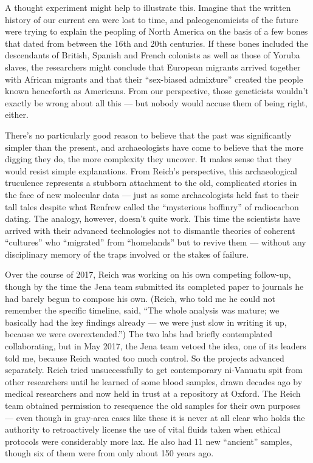 A thought experiment might help to illustrate this. Imagine that the
written history of our current era were lost to time, and
paleogenomicists of the future were trying to explain the peopling of
North America on the basis of a few bones that dated from between the
16th and 20th centuries. If these bones included the descendants of
British, Spanish and French colonists as well as those of Yoruba slaves,
the researchers might conclude that European migrants arrived together
with African migrants and that their ``sex-biased admixture'' created
the people known henceforth as Americans. From our perspective, those
geneticists wouldn't exactly be wrong about all this --- but nobody
would accuse them of being right, either.

There's no particularly good reason to believe that the past was
significantly simpler than the present, and archaeologists have come to
believe that the more digging they do, the more complexity they uncover.
It makes sense that they would resist simple explanations. From Reich's
perspective, this archaeological truculence represents a stubborn
attachment to the old, complicated stories in the face of new molecular
data --- just as some archaeologists held fast to their tall tales
despite what Renfrew called the ``mysterious boffinry'' of radiocarbon
dating. The analogy, however, doesn't quite work. This time the
scientists have arrived with their advanced technologies not to
dismantle theories of coherent ``cultures'' who ``migrated'' from
``homelands'' but to revive them --- without any disciplinary memory of
the traps involved or the stakes of failure.

Over the course of 2017, Reich was working on his own competing
follow-up, though by the time the Jena team submitted its completed
paper to journals he had barely begun to compose his own. (Reich, who
told me he could not remember the specific timeline, said, ``The whole
analysis was mature; we basically had the key findings already --- we
were just slow in writing it up, because we were overextended.'') The
two labs had briefly contemplated collaborating, but in May 2017, the
Jena team vetoed the idea, one of its leaders told me, because Reich
wanted too much control. So the projects advanced separately. Reich
tried unsuccessfully to get contemporary ni-Vanuatu spit from other
researchers until he learned of some blood samples, drawn decades ago by
medical researchers and now held in trust at a repository at Oxford. The
Reich team obtained permission to resequence the old samples for their
own purposes --- even though in gray-area cases like these it is never
at all clear who holds the authority to retroactively license the use of
vital fluids taken when ethical protocols were considerably more lax. He
also had 11 new ``ancient'' samples, though six of them were from only
about 150 years ago.

